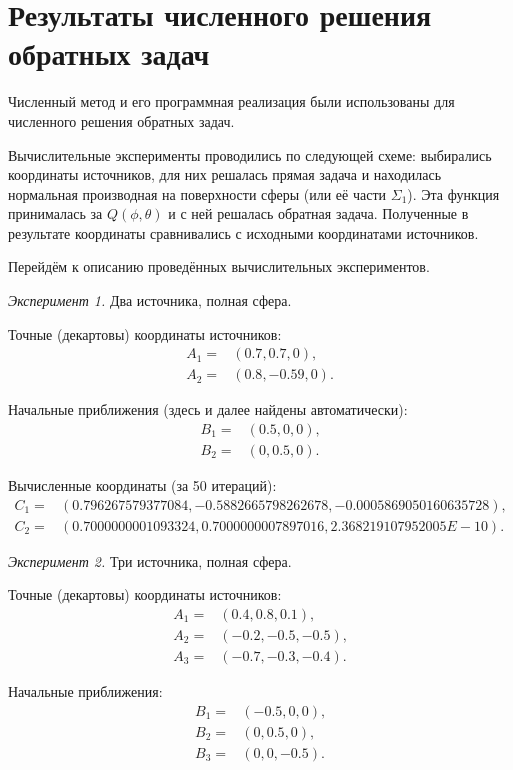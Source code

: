 \section{Результаты численного решения обратных задач}

Численный метод и его программная реализация были использованы для численного решения обратных задач.

Вычислительные эксперименты проводились по следующей схеме: выбирались координаты источников, для них решалась прямая задача и находилась нормальная производная на поверхности сферы (или её части $\Sigma_1$). Эта функция принималась за $Q(\phi, \theta)$ и с ней решалась обратная задача. Полученные в результате координаты сравнивались с исходными координатами источников.

Перейдём к описанию проведённых вычислительных экспериментов.

\emph{Эксперимент 1.} Два источника, полная сфера.

Точные (декартовы) координаты источников:
\begin{align}
    A_1 =& (0.7, 0.7, 0) \text{,}\nonumber\\
    A_2 =& (0.8, -0.59, 0) \text{.}\nonumber
\end{align}

Начальные приближения (здесь и далее найдены автоматически):
\begin{align}
    B_1 =& (0.5, 0, 0) \text{,}\nonumber\\
    B_2 =& (0, 0.5, 0) \text{.}\nonumber
\end{align}

Вычисленные координаты (за 50 итераций):
\begin{align}
    C_1 =& (0.796267579377084, -0.5882665798262678, -0.0005869050160635728) \text{,}\nonumber\\
    C_2 =& (0.7000000001093324, 0.7000000007897016, 2.368219107952005E-10) \text{.}\nonumber
\end{align}

\emph{Эксперимент 2.} Три источника, полная сфера.

Точные (декартовы) координаты источников:
\begin{align}
    A_1 =& (0.4, 0.8, 0.1) \text{,}\nonumber\\
    A_2 =& (-0.2, -0.5, -0.5) \text{,}\nonumber\\
    A_3 =& (-0.7, -0.3, -0.4) \text{.}\nonumber
\end{align}

Начальные приближения:
\begin{align}
    B_1 =& (-0.5, 0, 0) \text{,}\nonumber\\
    B_2 =& (0, 0.5, 0) \text{,}\nonumber\\
    B_3 =& (0, 0, -0.5) \text{.}\nonumber
\end{align}

